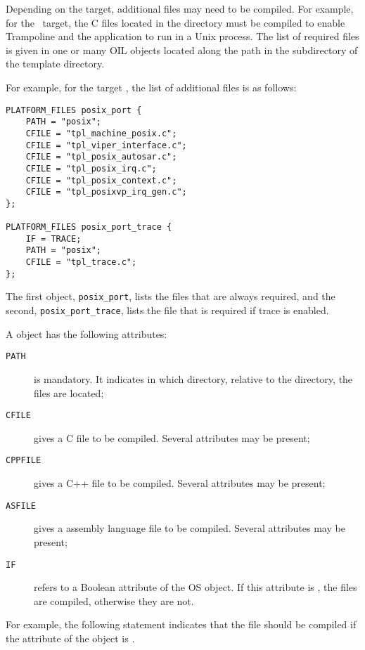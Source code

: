 Depending on the target, additional files may need to be compiled. For example, for the \posix\ target, the C files located in the  directory must be compiled to enable Trampoline and the application to run in a Unix process. The list of required files is given in one or many OIL objects located along the path in the  subdirectory of the template directory.

For example, for the target \posix, the list of additional files is as follows:

\begin{lstlisting}[language=OIL]
PLATFORM_FILES posix_port {
    PATH = "posix";
    CFILE = "tpl_machine_posix.c";
    CFILE = "tpl_viper_interface.c";
    CFILE = "tpl_posix_autosar.c";
    CFILE = "tpl_posix_irq.c";
    CFILE = "tpl_posix_context.c";
    CFILE = "tpl_posixvp_irq_gen.c";
};

PLATFORM_FILES posix_port_trace {
    IF = TRACE;
    PATH = "posix";
    CFILE = "tpl_trace.c";
};
\end{lstlisting}

The first object, \lstinline{posix_port}, lists the files that are always required, and the second, \lstinline{posix_port_trace}, lists the file  that is required if trace is enabled.

A  object has the following attributes:

\begin{description}
\item[\texttt{PATH}] is mandatory. It indicates in which directory, relative to the  directory, the files are located;
\item[\texttt{CFILE}] gives a C file to be compiled. Several  attributes may be present;
\item[\texttt{CPPFILE}] gives a C++ file to be compiled. Several  attributes may be present;
\item[\texttt{ASFILE}] gives a assembly language file to be compiled. Several  attributes may be present;
\item[\texttt{IF}] refers to a Boolean attribute of the OS object. If this attribute is , the files are compiled, otherwise they are not.
\end{description}

For example, the following statement indicates that the file  should be compiled if the  attribute of the  object is .

